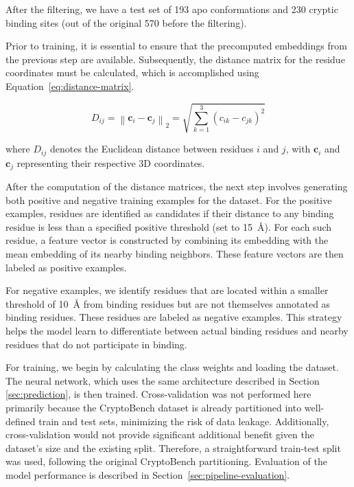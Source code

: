 After the filtering, we have a test set of 193 apo conformations and 230 cryptic binding sites (out of the original 570 before the filtering).

Prior to training, it is essential to ensure that the precomputed embeddings from the previous step are available. Subsequently, the distance matrix for the residue coordinates must be calculated, which is accomplished using Equation~\ref{eq:distance-matrix}.

\begin{equation}
D_{ij} = \left\| \mathbf{c}_i - \mathbf{c}_j \right\|_2 = \sqrt{ \sum_{k=1}^3 (c_{ik} - c_{jk})^2 }
\label{eq:distance-matrix}
\end{equation}

where $D_{ij}$ denotes the Euclidean distance between residues $i$ and $j$, with $\mathbf{c}_i$ and $\mathbf{c}_j$ representing their respective 3D coordinates.

After the computation of the distance matrices, the next step involves generating both positive and negative training examples for the dataset. For the positive examples, residues are identified as candidates if their distance to any binding residue is less than a specified positive threshold (set to 15~\AA). For each such residue, a feature vector is constructed by combining its embedding with the mean embedding of its nearby binding neighbors. These feature vectors are then labeled as positive examples.

For negative examples, we identify residues that are located within a smaller threshold of 10~\AA{} from binding residues but are not themselves annotated as binding residues. These residues are labeled as negative examples. This strategy helps the model learn to differentiate between actual binding residues and nearby residues that do not participate in binding.

For training, we begin by calculating the class weights and loading the dataset. The neural network, which uses the same architecture described in Section \ref{sec:prediction}, is then trained. Cross-validation was not performed here primarily because the CryptoBench dataset is already partitioned into well-defined train and test sets, minimizing the risk of data leakage. Additionally, cross-validation would not provide significant additional benefit given the dataset's size and the existing split. Therefore, a straightforward train-test split was used, following the original CryptoBench partitioning. Evaluation of the model performance is described in Section~\ref{sec:pipeline-evaluation}.

